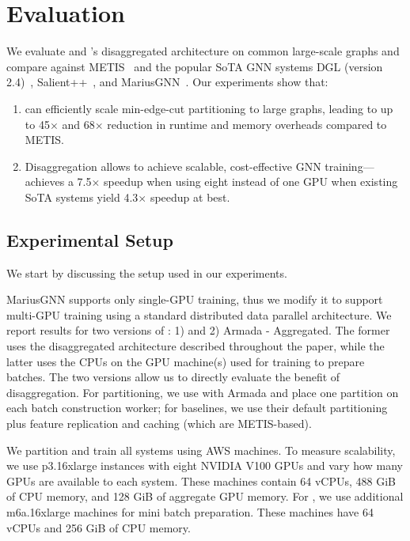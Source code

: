 \section{Evaluation}
\label{sec:eval}
We evaluate \partitioning and \systemname's disaggregated architecture on common large-scale graphs and compare against METIS~\cite{karypis1997metis} and the popular SoTA GNN systems DGL (version 2.4)~\cite{dgl, distDGL}, Salient++~\cite{salient++}, and MariusGNN~\cite{mariusgnn}. Our experiments show that:

\begin{enumerate}[topsep=0pt, left=0pt, noitemsep]
    \item \partitioning can efficiently scale min-edge-cut partitioning to large graphs, leading to up to 45$\times$ and 68$\times$ reduction in runtime and memory overheads compared to METIS.
    \item Disaggregation allows \systemname to achieve scalable, cost-effective GNN training---\systemname achieves a 7.5$\times$ speedup when using eight instead of one GPU when existing SoTA systems yield 4.3$\times$ speedup at best.
\end{enumerate}



\subsection{Experimental Setup}
We start by discussing the setup used in our experiments.

MariusGNN supports only single-GPU training, thus we modify it to support multi-GPU training using a standard distributed data parallel architecture. We report results for two versions of \systemname: 1) \systemname and 2) Armada - Aggregated. The former uses the disaggregated architecture described throughout the paper, while the latter uses the CPUs on the GPU machine(s) used for training to prepare batches. The two versions allow us to directly evaluate the benefit of disaggregation. For partitioning, we use \partitioning with Armada and place one partition on each batch construction worker; for baselines, we use their default partitioning plus feature replication and caching (which are METIS-based).

We partition and train all systems using AWS machines. 
To measure scalability, we use p3.16xlarge instances with eight NVIDIA V100 GPUs and vary how many GPUs are available to each system. These machines contain 64 vCPUs, 488 GiB of CPU memory, and 128 GiB of aggregate GPU memory. For \systemname, we use additional m6a.16xlarge machines for mini batch preparation. These machines have 64 vCPUs and 256 GiB of CPU memory. 

